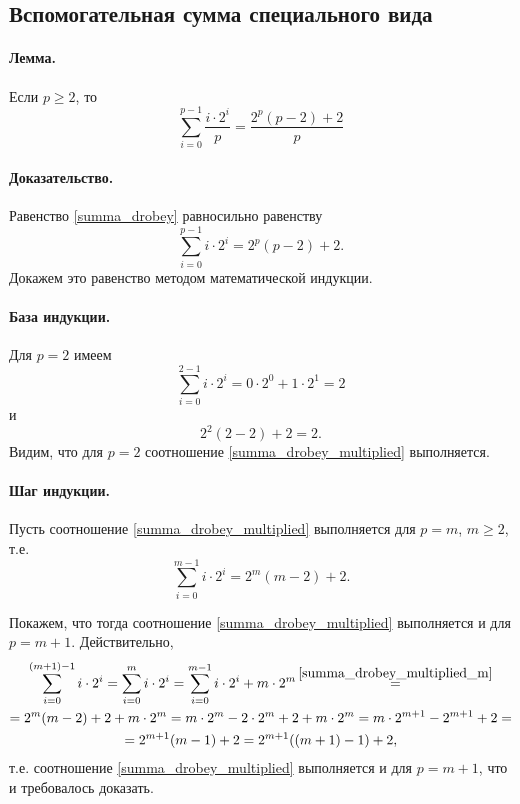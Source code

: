 \subsection{Вспомогательная сумма специального вида}
\paragraph{Лемма.}
Если $p\geq 2$, то
\begin{equation}\label{summa_drobey}
	\sum_{i=0}^{p-1} \frac{i \cdot 2^i}{p} = \frac{2^p(p-2) + 2}{p}
\end{equation}


\paragraph{Доказательство.}
Равенство \eqref{summa_drobey} равносильно равенству
\begin{equation}\label{summa_drobey_multiplied}
	\sum_{i=0}^{p-1} i \cdot 2^i = 2^p(p-2) + 2
	.
\end{equation}
Докажем это равенство методом математической индукции.

\paragraph{База индукции.}
Для $p=2$ имеем
\begin{equation}
	\sum_{i=0}^{2-1} i \cdot 2^i = 0 \cdot 2^0 + 1 \cdot 2^1 = 2
\end{equation}
и
\begin{equation}
	2^2(2-2) + 2 = 2
	.
\end{equation}
Видим, что для $p=2$ соотношение \eqref{summa_drobey_multiplied} выполняется.

\paragraph{Шаг индукции.}
Пусть соотношение \eqref{summa_drobey_multiplied} выполняется для $p=m$, $m\geq 2$, т.е.
\begin{equation}\label{summa_drobey_multiplied_m}
	\sum_{i=0}^{m-1} i \cdot 2^i = 2^m(m-2) + 2
	.
\end{equation}

Покажем, что тогда соотношение \eqref{summa_drobey_multiplied} выполняется и для $p=m+1$.
Действительно,
\begin{multline}
	\sum_{i=0}^{(m+1)-1} i \cdot 2^i
	=
	\sum_{i=0}^{m} i \cdot 2^i
	=
	\sum_{i=0}^{m - 1} i \cdot 2^i + m\cdot 2 ^m
	\mathop{=}^{\eqref{summa_drobey_multiplied_m}}
	\\=
	2^m(m-2) + 2 + m\cdot 2 ^m
	=
	m\cdot2^m-2\cdot2^m  + 2 + m\cdot 2 ^m
	=
	m\cdot2^{m+1}-2^{m+1}  + 2
	=
	\\=
	2^{m+1}(m-1)  + 2
	=
	2^{m+1}((m+1)-1)  + 2
	,
\end{multline}
т.е. соотношение \eqref{summa_drobey_multiplied} выполняется и для $p=m+1$,
что и требовалось доказать.



